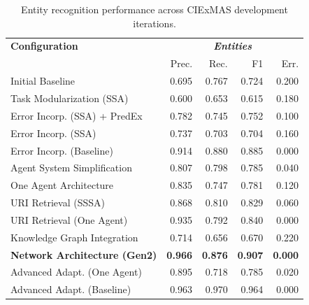 \documentclass[a4paper,oneside,bibliography=totoc]{scrbook}
\begin{document}
\begin{table}[h]
  \centering
  \begin{tabular}{p{6cm}|rrrr}
    \toprule
    \textbf{Configuration}               & \multicolumn{4}{c}{\textit{\textbf{Entities}}}                                                    \\
                                         & Prec.                                          & Rec.           & F1             & Err.           \\
    \midrule
    Initial Baseline                     & 0.695                                          & 0.767          & 0.724          & 0.200          \\
    Task Modularization (SSA)            & 0.600                                          & 0.653          & 0.615          & 0.180          \\
    Error Incorp. (SSA) + PredEx         & 0.782                                          & 0.745          & 0.752          & 0.100          \\
    Error Incorp. (SSA)                  & 0.737                                          & 0.703          & 0.704          & 0.160          \\
    Error Incorp. (Baseline)             & 0.914                                          & 0.880          & 0.885          & 0.000          \\
    Agent System Simplification          & 0.807                                          & 0.798          & 0.785          & 0.040          \\
    One Agent Architecture               & 0.835                                          & 0.747          & 0.781          & 0.120          \\
    URI Retrieval (SSSA)                 & 0.868                                          & 0.810          & 0.829          & 0.060          \\
    URI Retrieval (One Agent)            & 0.935                                          & 0.792          & 0.840          & 0.000          \\
    Knowledge Graph Integration          & 0.714                                          & 0.656          & 0.670          & 0.220          \\
    \textbf{Network Architecture (Gen2)} & \textbf{0.966}                                 & \textbf{0.876} & \textbf{0.907} & \textbf{0.000} \\
    Advanced Adapt. (One Agent)          & 0.895                                          & 0.718          & 0.785          & 0.020          \\
    Advanced Adapt. (Baseline)           & 0.963                                          & 0.970          & 0.964          & 0.000          \\
    \bottomrule
  \end{tabular}
  \caption{Entity recognition performance across CIExMAS development iterations.}
  \label{tab:evaluation_entities_iterations}
\end{table}
\end{document}
